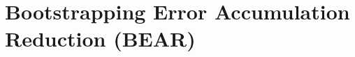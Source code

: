 



\vspace{-0.2cm}
\section{Bootstrapping Error Accumulation Reduction (BEAR)}
\label{sec:bear}
\vspace{-0.2cm}

